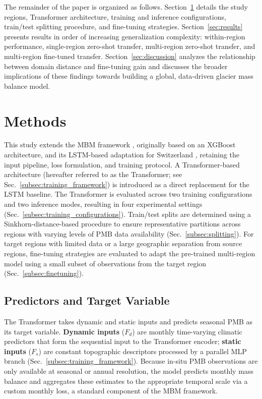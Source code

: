 \documentclass[draft]{agujournal2019}
\begin{document}
The remainder of the paper is organized as follows. Section~\ref{sec:methods} details the study regions, Transformer architecture, training and inference configurations, train/test splitting procedure, and fine-tuning strategies. Section~\ref{sec:results} presents results in order of increasing generalization complexity: within-region performance, single-region zero-shot transfer, multi-region zero-shot transfer, and multi-region fine-tuned transfer. Section~\ref{sec:discussion} analyzes the relationship between domain distance and fine-tuning gain and discusses the broader implications of these findings towards building a global, data-driven glacier mass balance model.


\section{Methods}\label{sec:methods}

This study extends the MBM framework \citep{Sjursen2025}, originally based on an XGBoost architecture, and its LSTM-based adaptation for Switzerland \citep{vanderMeer_2026}, retaining the input pipeline, loss formulation, and training protocol. A Transformer-based architecture (hereafter referred to as the Transformer; see Sec.~\ref{subsec:training_framework}) is introduced as a direct replacement for the LSTM baseline. The Transformer is evaluated across two training configurations and two inference modes, resulting in four experimental settings (Sec.~\ref{subsec:training_configurations}). Train/test splits are determined using a Sinkhorn-distance-based procedure to ensure representative partitions across regions with varying levels of PMB data availability (Sec.~\ref{subsec:splitting}). For target regions with limited data or a large geographic separation from source regions, fine-tuning strategies are evaluated to adapt the pre-trained multi-region model using a small subset of observations from the target region (Sec.~\ref{subsec:finetuning}).

\subsection{Predictors and Target Variable}\label{subsec:predictors_target}

The Transformer takes dynamic and static inputs and predicts seasonal PMB as its target variable. \textbf{Dynamic inputs} ($F_d$) are monthly time-varying climatic predictors that form the sequential input to the Transformer encoder; \textbf{static inputs} ($F_s$) are constant topographic descriptors processed by a parallel MLP branch (Sec.~\ref{subsec:training_framework}). Because in-situ PMB observations are only available at seasonal or annual resolution, the model predicts monthly mass balance and aggregates these estimates to the appropriate temporal scale via a custom monthly loss, a standard component of the MBM framework.
\end{document}
